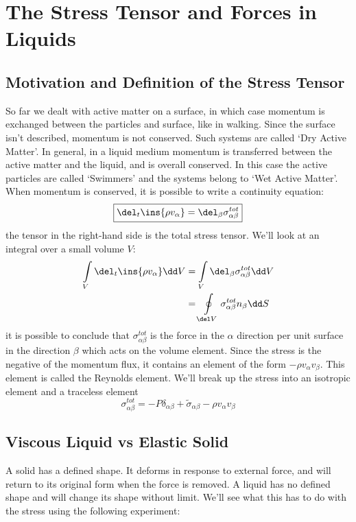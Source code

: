 \section{The Stress Tensor and Forces in Liquids}
\subsection{Motivation and Definition of the Stress Tensor}
So far we dealt with active matter on a surface, in which case momentum is exchanged between the particles and surface, like in walking. Since the surface isn't described, momentum is not conserved. Such systems are called `Dry Active Matter'. In general, in a liquid medium momentum is transferred between the active matter and the liquid, and is overall conserved. In this case the active particles are called `Swimmers' and the systems belong to `Wet Active Matter'. When momentum is conserved, it is possible to write a continuity equation:
\begin{equation}
    \boxed{\del_t\ins{\rho v_\alpha} = \del_\beta\sigma_{\alpha\beta}^{tot}}
\end{equation}
the tensor in the right-hand side is the total stress tensor. We'll look at an integral over a small volume \(V\):
\begin{align}
    \int\limits_V\del_t\ins{\rho v_\alpha}\dd V &= \int\limits_V \del_\beta\sigma_{\alpha\beta}^{tot}\dd V\\
    &= \oint\limits_{\del V}\sigma_{\alpha\beta}^{tot}n_\beta\dd S
\end{align}
it is possible to conclude that \(\sigma_{\alpha\beta}^{tot}\) is the force in the \(\alpha \) direction per unit surface in the direction \(\beta \) which acts on the volume element. Since the stress is the negative of the momentum flux, it contains an element of the form \(-\rho v_\alpha v_\beta \). This element is called the Reynolds element. We'll break up the stress into an isotropic element and a traceless element
\begin{equation}
    \boxed{\sigma_{\alpha\beta}^{tot} = -P\delta_{\alpha\beta}+\tilde{\sigma}_{\alpha\beta}-\rho v_\alpha v_\beta}
\end{equation}
\subsection{Viscous Liquid vs Elastic Solid}
A solid has a defined shape. It deforms in response to external force, and will return to its original form when the force is removed. A liquid has no defined shape and will change its shape without limit. We'll see what this has to do with the stress using the following experiment:

